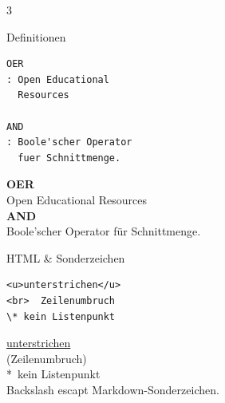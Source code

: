 \documentclass[a4paper,landscape,9pt]{extarticle}
\newcommand{\prevtxt}[1]{{\small #1}}
\begin{document}
\begin{multicols}{3}
\begin{mdcard}{Definitionen}
\begin{lstlisting}[language=lia]
OER
: Open Educational
  Resources

AND
: Boole'scher Operator
  fuer Schnittmenge.
\end{lstlisting}
\tcblower
\prevtxt{\textbf{OER}\\
\hspace*{1em}Open Educational Resources\\[3pt]
\textbf{AND}\\
\hspace*{1em}Boole'scher Operator für Schnittmenge.}
\end{mdcard}

\begin{mdcard}{HTML \& Sonderzeichen}
\begin{lstlisting}[language=lia]
<u>unterstrichen</u>
<br>  Zeilenumbruch
\* kein Listenpunkt
\end{lstlisting}
\tcblower
\prevtxt{\underline{unterstrichen}\\
{\scriptsize\color{muted}(Zeilenumbruch)}\\
*~kein Listenpunkt\\[2pt]
{\scriptsize\color{muted}Backslash escapt Markdown-Sonderzeichen.}}
\end{mdcard}

\end{multicols}
\end{document}
